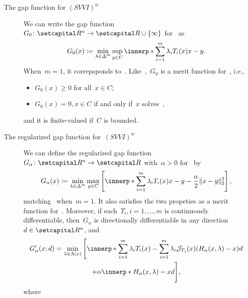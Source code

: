 \documentclass[../../main]{subfiles}
\begin{document}
\begin{example} 
    \begin{description}
        \item[The gap function for $(SVVI)^w$~\cite{Charitha2010,Li2010}]
            We can write the gap function~$G_0 \colon \setR^n \to \setR \cup \set{\infty}$ for~ as
            \begin{equation}
                G_0(x) \coloneqq \min_{\lambda \in \simplex^m} \sup_{y \in C} \innerp*{\sum_{i = 1}^{m} \lambda_i T_i(x)}{x - y}
            .\end{equation} 
            When~$m = 1$, it correpsponds to~.
            Like~,~$G_0$ is a merit function for~, i.e.,
            \begin{itemize}
                \item $G_0(x) \ge 0$ for all~$x \in C$;
                \item $G_0(x) = 0, x \in C$ if and only if~$x$ solves~,
            \end{itemize}
            and it is finite-valued if~$C$ is bounded.
        \item[The regularized gap function for~$(SVVI)^w$~\cite{Charitha2010}]
            We can define the regularized gap function~$G_\alpha \colon \setR^n \to \setR$ with~$\alpha > 0$ for~ by
            \begin{equation} \label{eq:reg_gap_SVVIw}
                G_\alpha(x) \coloneqq \min_{\lambda \in \simplex^m} \max_{y \in C} \left[ \innerp*{\sum_{i = 1}^{m} \lambda_i T_i(x)}{x - y} - \frac{\alpha}{2} \norm{x - y}_2^2 \right] 
            ,\end{equation} 
            matching~ when~$m = 1$.
            It also satisfies the two propeties as a merit function for~.
            Moreover, if each~$T_i, i = 1, \dots, m$ is continuously differentiable, then~$G_\alpha$ is directionally differentiable in any direction~$d \in \setR^n$, and
            \begin{multline}
                G_\alpha'(x;d) = \min_{\lambda \in \Lambda(x)} \Bigg[ \innerp*{\sum_{i = 1}^{m} \lambda_i T_i(x) - \sum_{i = 1}^{m} \lambda_i \jdv{T_i}{x} (H_\alpha(x, \lambda) - x)}{d} \\
                + \alpha \innerp*{H_\alpha(x, \lambda) - x}{d} \Bigg] 
            ,\end{multline}
            where
            \begin{align}

\end{align}
\end{description}
\end{example}
\end{document}
